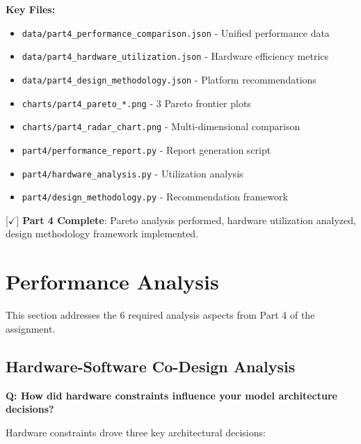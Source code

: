 \documentclass[10pt, a4paper]{article}
\begin{document}
\textbf{Key Files:}
\begin{itemize}
    \item \texttt{data/part4\_performance\_comparison.json} - Unified performance data
    \item \texttt{data/part4\_hardware\_utilization.json} - Hardware efficiency metrics
    \item \texttt{data/part4\_design\_methodology.json} - Platform recommendations
    \item \texttt{charts/part4\_pareto\_*.png} - 3 Pareto frontier plots
    \item \texttt{charts/part4\_radar\_chart.png} - Multi-dimensional comparison
    \item \texttt{part4/performance\_report.py} - Report generation script
    \item \texttt{part4/hardware\_analysis.py} - Utilization analysis
    \item \texttt{part4/design\_methodology.py} - Recommendation framework
\end{itemize}

[$\checkmark$] \textbf{Part 4 Complete}: Pareto analysis performed, hardware utilization analyzed, design methodology framework implemented.

\newpage
\section*{Performance Analysis}

This section addresses the 6 required analysis aspects from Part 4 of the assignment.

\subsection{Hardware-Software Co-Design Analysis}

\textbf{Q: How did hardware constraints influence your model architecture decisions?}

Hardware constraints drove three key architectural decisions:
\end{document}
